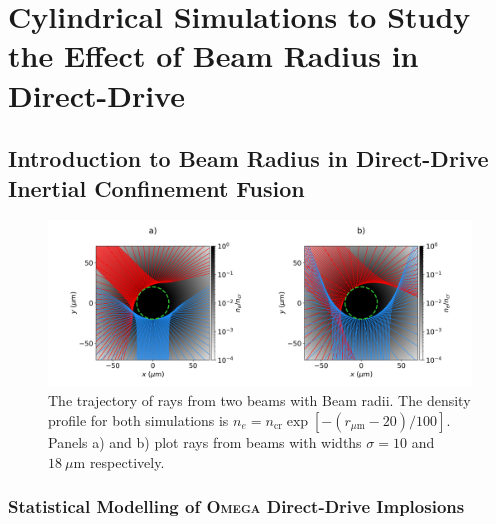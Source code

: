 \chapter{Cylindrical Simulations to Study the Effect of Beam Radius in Direct-Drive}



\section{Introduction to Beam Radius in Direct-Drive Inertial Confinement Fusion}%
\label{sec:Res1_Beamrad_intro}

\begin{figure}[t!]
    \includegraphics[width=\linewidth]{Results1/Images/RbRt_beam_overlap.png}
    \centering
    \caption{The trajectory of rays from two beams with Beam radii.
    The density profile for both simulations is $n_e=n_{\text{cr}}\exp{[ -(r_{\mu\text{m}}-20)/100 ]}$.
    Panels a) and b) plot rays from beams with widths $\sigma=10$ and $18\ \mu\text{m}$ respectively.}%
    \label{fig:Res1_RbRt_beam_overlap}
\end{figure}




\subsection{Statistical Modelling of \textsc{Omega} Direct-Drive Implosions}%
\label{sec:Res1_OMEGA_stat_modelling}


